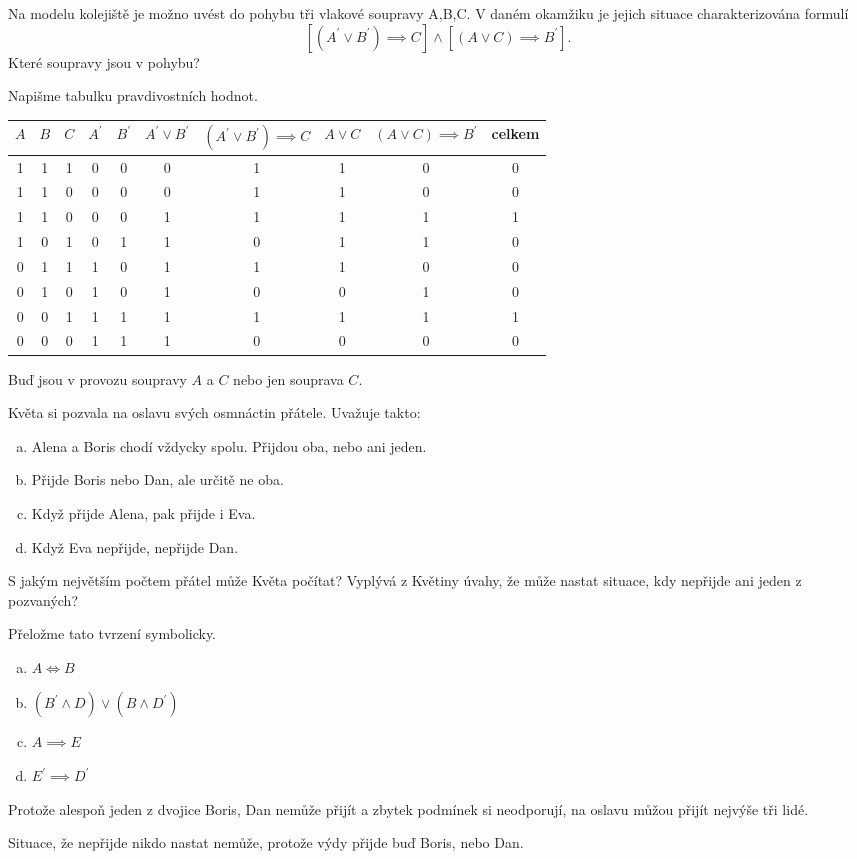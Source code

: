 \begin{example}[SMP 144/8]
  Na modelu kolejiště je možno uvést do pohybu tři vlakové soupravy A,B,C. V daném okamžiku je jejich
situace charakterizována formulí $$\left[(A^\prime \lor B^\prime) \implies C\right]\land\left[(A \lor C) \implies B^\prime\right].$$ Které soupravy jsou v pohybu?

\rm Napišme tabulku pravdivostních hodnot.
\begin{center}
  \begin{tabular}{c c c c c | c c c c c}
    $A$ & $B$ & $C$ & $A^\prime$ & $B^\prime$ & $A^\prime \lor B^\prime$ & $(A^\prime \lor B^\prime) \implies C$ & $A\lor C$ & $(A \lor C) \implies B^\prime $ & celkem\\
    \hline
    1 & 1 & 1 & 0 & 0 & 0 & 1 & 1 & 0 & 0 \\
    1 & 1 & 0 & 0 & 0 & 0 & 1 & 1 & 0 & 0 \\
    1 & 1 & 0 & 0 & 0 & 1 & 1 & 1 & 1 & 1 \\
    1 & 0 & 1 & 0 & 1 & 1 & 0 & 1 & 1 & 0 \\
    0 & 1 & 1 & 1 & 0 & 1 & 1 & 1 & 0 & 0 \\
    0 & 1 & 0 & 1 & 0 & 1 & 0 & 0 & 1 & 0 \\
    0 & 0 & 1 & 1 & 1 & 1 & 1 & 1 & 1 & 1 \\
    0 & 0 & 0 & 1 & 1 & 1 & 0 & 0 & 0 & 0
  \end{tabular}
\end{center}
Buď jsou v provozu soupravy $A$ a $C$ nebo jen souprava $C$.
\end{example}

\begin{example}[SMP 144/10]
  Květa si pozvala na oslavu svých osmnáctin přátele. Uvažuje takto:
  \begin{enumerate}[a.]
    \item Alena a Boris chodí vždycky spolu. Přijdou oba, nebo ani jeden.
    \item Přijde Boris nebo Dan, ale určitě ne oba.
    \item Když přijde Alena, pak přijde i Eva.
    \item Když Eva nepřijde, nepřijde Dan.
  \end{enumerate}
  S jakým největším počtem přátel může Květa počítat? Vyplývá z Květiny úvahy, že může nastat situace, kdy nepřijde ani jeden z pozvaných?

  \rm Přeložme tato tvrzení symbolicky.
  \begin{enumerate}[a.]
    \item $A\iff B$
    \item $(B^\prime \land D) \lor (B \land D^\prime)$
    \item $A\implies E$
    \item $E^\prime \implies D^\prime$
  \end{enumerate}
  Protože alespoň jeden z dvojice Boris, Dan nemůže přijít a zbytek podmínek si neodporují, na oslavu můžou přijít nejvýše tři lidé.

  Situace, že nepřijde nikdo nastat nemůže, protože výdy přijde buď Boris, nebo Dan.
\end{example}

